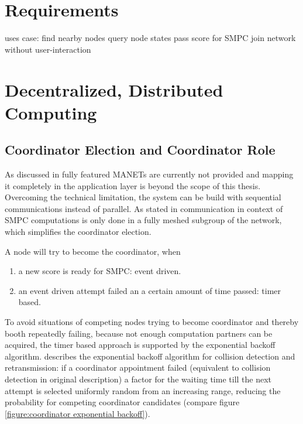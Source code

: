 	\section{Requirements}
	\label{Requirements}
	
		
		uses case:
		find nearby nodes
		query node states
		pass score for SMPC
		join network without user-interaction
		

	\section{Decentralized, Distributed Computing}
	\label{Decentralized, Distributed Computing}

		\subsection{Coordinator Election and Coordinator Role}
		\label{Coordinator Election}
		
		As discussed in  fully featured \gls{MANET}s are currently not provided and mapping it completely in the application layer is beyond the scope of this thesis. Overcoming the technical limitation, the system can be build with sequential communications instead of parallel. As stated in  communication in context of \gls{SMPC} computations is only done in a fully meshed subgroup of the network, which simplifies the coordinator election.
		
		\noindent A node will try to become the coordinator, when 
		\vspace{-\topsep}
		\begin{enumerate}
			\itemsep-0.5em
			\item a new score is ready for \gls{SMPC}: event driven.
			\item an event driven attempt failed an a certain amount of time passed: timer based.
		\end{enumerate}
		
		To avoid situations of competing nodes trying to become coordinator and thereby booth repeatedly failing, because not enough computation partners can be acquired, the timer based approach is supported by the exponential backoff algorithm. \textcite[p.67]{IEEE2010} describes the exponential backoff algorithm for collision detection and retransmission: if a coordinator appointment failed (equivalent to collision detection in original description) a factor for the waiting time till the next attempt is selected uniformly random from an increasing range, reducing the probability for competing coordinator candidates (compare figure \ref{figure:coordinator exponential backoff}).
		
